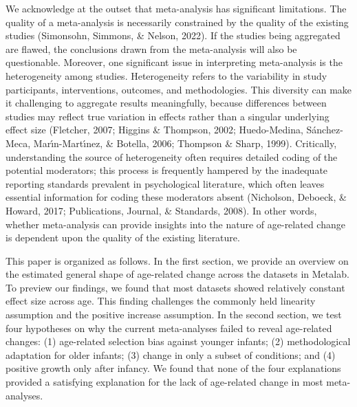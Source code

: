 \documentclass[
  man]{apa6}
\begin{document}
We acknowledge at the outset that meta-analysis has significant limitations. The quality of a meta-analysis is necessarily constrained by the quality of the existing studies (Simonsohn, Simmons, \& Nelson, 2022). If the studies being aggregated are flawed, the conclusions drawn from the meta-analysis will also be questionable. Moreover, one significant issue in interpreting meta-analysis is the heterogeneity among studies. Heterogeneity refers to the variability in study participants, interventions, outcomes, and methodologies. This diversity can make it challenging to aggregate results meaningfully, because differences between studies may reflect true variation in effects rather than a singular underlying effect size (Fletcher, 2007; Higgins \& Thompson, 2002; Huedo-Medina, Sánchez-Meca, Marı́n-Martı́nez, \& Botella, 2006; Thompson \& Sharp, 1999). Critically, understanding the source of heterogeneity often requires detailed coding of the potential moderators; this process is frequently hampered by the inadequate reporting standards prevalent in psychological literature, which often leaves essential information for coding these moderators absent (Nicholson, Deboeck, \& Howard, 2017; Publications, Journal, \& Standards, 2008). In other words, whether meta-analysis can provide insights into the nature of age-related change is dependent upon the quality of the existing literature.

This paper is organized as follows. In the first section, we provide an overview on the estimated general shape of age-related change across the datasets in Metalab. To preview our findings, we found that most datasets showed relatively constant effect size across age. This finding challenges the commonly held linearity assumption and the positive increase assumption. In the second section, we test four hypotheses on why the current meta-analyses failed to reveal age-related changes: (1) age-related selection bias against younger infants; (2) methodological adaptation for older infants; (3) change in only a subset of conditions; and (4) positive growth only after infancy. We found that none of the four explanations provided a satisfying explanation for the lack of age-related change in most meta-analyses.
\end{document}
